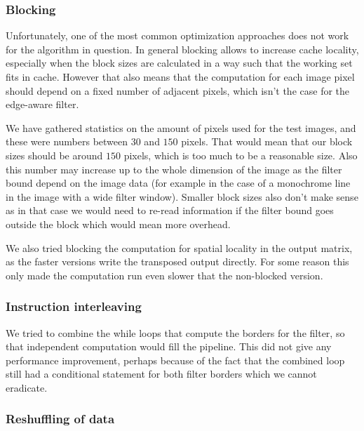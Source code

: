 
\subsubsection{Blocking}

Unfortunately, one of the most common optimization approaches does not work for the algorithm in question. In general blocking allows to increase cache locality, especially when the block sizes are calculated in a way such that the working set fits in cache. However that also means that the computation for each image pixel should depend on a fixed number of adjacent pixels, which isn't the case for the edge-aware filter.

We have gathered statistics on the amount of pixels used for the test images, and these were numbers between $30$ and $150$ pixels. That would mean that our block sizes should be around $150$ pixels, which is too much to be a reasonable size. Also this number may increase up to the whole dimension of the image as the filter bound depend on the image data (for example in the case of a monochrome line in the image with a wide filter window). Smaller block sizes also don't make sense as in that case we would need to re-read information if the filter bound goes outside the block which would mean more overhead. 

We also tried blocking the computation for spatial locality in the output matrix, as the faster versions write the transposed output directly. For some reason this only made the computation run even slower that the non-blocked version.

\subsubsection{Instruction interleaving}

We tried to combine the while loops that compute the borders for the filter, so that independent computation would fill the pipeline. This did not give any performance improvement, perhaps because of the fact that the combined loop still had a conditional statement for both filter borders which we cannot eradicate.

\subsubsection{Reshuffling of data}

